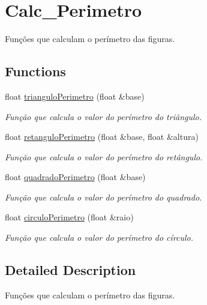 \hypertarget{group__Calc__Perimetro}{}\section{Calc\+\_\+\+Perimetro}
\label{group__Calc__Perimetro}


Funções que calculam o perímetro das figuras.  


\subsection*{Functions}
\begin{DoxyCompactItemize}
\item 
float \hyperlink{group__Calc__Perimetro_ga76a18caf86cad87741930b6b73a28e6d}{triangulo\+Perimetro} (float \&base)
\begin{DoxyCompactList}\small\item\em Função que calcula o valor do perímetro do triângulo. \end{DoxyCompactList}\item 
float \hyperlink{group__Calc__Perimetro_ga818dc286a8e9892293bddf8c2c4611dd}{retangulo\+Perimetro} (float \&base, float \&altura)
\begin{DoxyCompactList}\small\item\em Função que calcula o valor do perímetro do retângulo. \end{DoxyCompactList}\item 
float \hyperlink{group__Calc__Perimetro_ga262504d9854cd41bc2519504de0531ca}{quadrado\+Perimetro} (float \&base)
\begin{DoxyCompactList}\small\item\em Função que calcula o valor do perímetro do quadrado. \end{DoxyCompactList}\item 
float \hyperlink{group__Calc__Perimetro_gabf774992f344a535b77e941cabb7e2f0}{circulo\+Perimetro} (float \&raio)
\begin{DoxyCompactList}\small\item\em Função que calcula o valor do perímetro do círculo. \end{DoxyCompactList}\end{DoxyCompactItemize}


\subsection{Detailed Description}
Funções que calculam o perímetro das figuras. 




